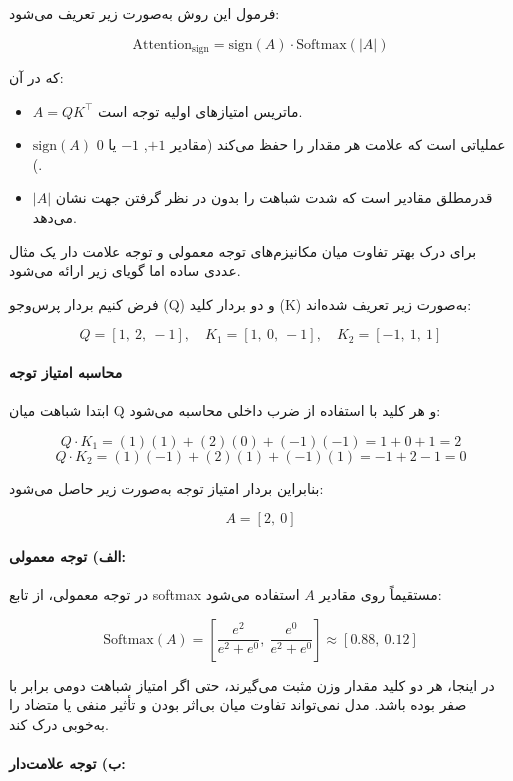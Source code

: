 فرمول این روش به‌صورت زیر تعریف می‌شود:

\begin{equation}
	\text{Attention}_{\text{sign}} = \text{sign}(A) \cdot \text{Softmax}(|A|)
\end{equation}


که در آن:
\begin{itemize}
	\item $A = QK^\top$ ماتریس امتیازهای اولیه توجه است.
	\item $\text{sign}(A)$ عملیاتی است که علامت هر مقدار را حفظ می‌کند (مقادیر $+1$, $-1$ یا $0$).
	\item $|A|$ قدرمطلق مقادیر است که شدت شباهت را بدون در نظر گرفتن جهت نشان می‌دهد.
\end{itemize}


برای درک بهتر تفاوت میان مکانیزم‌های توجه معمولی و توجه علامت دار یک مثال عددی ساده اما گویای زیر ارائه می‌شود.

فرض کنیم  بردار پرس‌وجو (Q) و دو بردار کلید (K) به‌صورت زیر تعریف شده‌اند:

\[
Q = [1,\ 2,\ -1], \quad
K_1 = [1,\ 0,\ -1], \quad
K_2 = [-1,\ 1,\ 1]
\]

\paragraph{محاسبه امتیاز توجه}

ابتدا شباهت میان Q و هر کلید با استفاده از ضرب داخلی محاسبه می‌شود:

\[
Q \cdot K_1 = (1)(1) + (2)(0) + (-1)(-1) = 1 + 0 + 1 = 2
\]
\[
Q \cdot K_2 = (1)(-1) + (2)(1) + (-1)(1) = -1 + 2 -1 = 0
\]

بنابراین بردار امتیاز توجه به‌صورت زیر حاصل می‌شود:

\[
A = [2,\ 0]
\]

\paragraph{الف) توجه معمولی:}

در توجه معمولی، از تابع softmax مستقیماً روی مقادیر $A$ استفاده می‌شود:

\[
\text{Softmax}(A) =
\left[
\frac{e^2}{e^2 + e^0},\ 
\frac{e^0}{e^2 + e^0}
\right]
\approx [0.88,\ 0.12]
\]

در اینجا، هر دو کلید مقدار وزن مثبت می‌گیرند، حتی اگر امتیاز شباهت دومی برابر با صفر بوده باشد. مدل نمی‌تواند تفاوت میان بی‌اثر بودن و تأثیر منفی یا متضاد را به‌خوبی درک کند.

\paragraph{ب) توجه علامت‌دار:}

